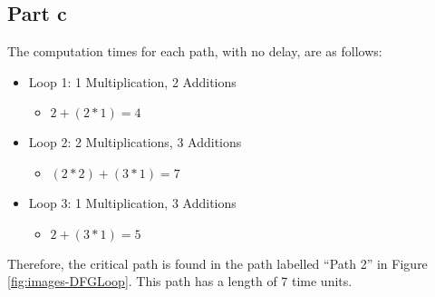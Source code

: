 \subsection{Part c}

The computation times for each path, with no delay, are as follows:

\begin{itemize}
	\item Loop 1: 1 Multiplication, 2 Additions
	\begin{itemize}
		\item $2+(2*1)=4$
	\end{itemize}
	\item Loop 2: 2 Multiplications, 3 Additions
	\begin{itemize}
		\item $(2*2)+(3*1)=7$
	\end{itemize}
	\item Loop 3: 1 Multiplication, 3 Additions
	\begin{itemize}
		\item $2+(3*1)=5$
	\end{itemize}
\end{itemize}
Therefore, the critical path is found in the path labelled ``Path 2'' in
Figure \ref{fig:images-DFGLoop}. This path has a length of 7 time units.
